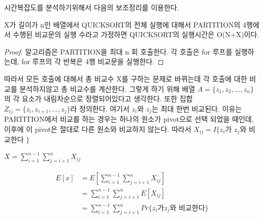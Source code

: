 시간복잡도를 분석하기위해서 다음의 보조정리를 이용한다.



\begin{lemma}
    X가 길이가 n인 배열에서 QUICKSORT의 전체 실행에 대해서 PARTITION의 4행에서 수행된 비교문의 실행 수라고 가정하면 QUICKSORT의 실행시간은 O(N+X)이다.    
\end{lemma}






\begin{proof}
    알고리즘은 PARTITION을 최대 n 회 호출한다. 각 호출은 for 루프를 실행하는데, for 루프의 각 반복은 4행 비교문을 실행한다.    
\end{proof}

따라서 모든 호출에 대해서 총 비교수 X를 구하는 문제로 바뀌는데 각 호출에 대한 비교를 분석하지않고 총 비교수를 계산한다.
그렇게 하기 위해 배열 $A = \{z_1 , z_2, ... , z_n\}$의 각 요소가 내림차순으로 정렬되어있다고 생각한다. 또한 집합 $Z_{ij} = \{z_i, z_{i+1}, ..., z_j\}$라 정의한다. 여기서 $z_i$와 $z_j$는 최대 한번 비교된다. 이유는 PARTITION에서 비교를 하는 경우는 하나의 원소가 pivot으로 선택 되었을 때인데, 이후에 이 pivot은 절대로 다른 원소와 비교하지 않는다.
따라서
$X_{ij} = I\{ z_i$가 $z_j$와 비교한다 $\}$

$ X = \sum_{i=1}^{n-1}\sum_{j=i+1}^{n} X_{ij}$

\begin{align*}
    E[x] &= E \left[ \sum_{i=1}^{n-1}\sum_{j=i+1}^{n} X_{ij} \right] \\
    &= \sum_{i=1}^{n-1}\sum_{j=i+1}^{n} E\left[X_{ij} \right] \\
    &= \sum_{i=1}^{n-1}\sum_{j=i+1}^{n}Pr\{ z_i \mbox{가} z_j\mbox{와 비교한다} \} 
\end{align*}    
    
